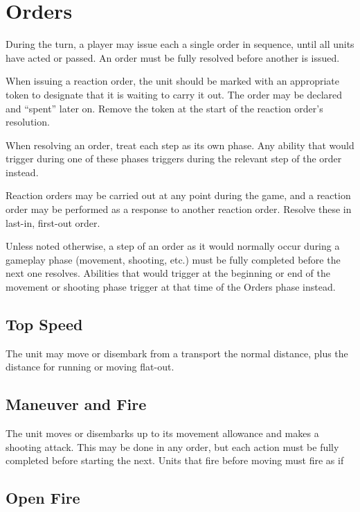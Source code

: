 \documentclass[letterpaper,twocolumn,oneside,titlepage]{book}
\begin{document}
\section{\texorpdfstring{\textbf{Orders}}{Orders}}\label{orders}

During the turn, a player may issue each a single order in sequence,
until all units have acted or passed. An order must be fully resolved
before another is issued.

When issuing a reaction order, the unit should be marked with an
appropriate token to designate that it is waiting to carry it out. The
order may be declared and ``spent'' later on. Remove the token at the
start of the reaction order's resolution.

When resolving an order, treat each step as its own phase. Any ability
that would trigger during one of these phases triggers during the
relevant step of the order instead.

Reaction orders may be carried out at any point during the game, and a
reaction order may be performed as a response to another reaction order.
Resolve these in last-in, first-out order.

Unless noted otherwise, a step of an order as it would normally occur
during a gameplay phase (movement, shooting, etc.) must be fully
completed before the next one resolves. Abilities that would trigger at
the beginning or end of the movement or shooting phase trigger at that
time of the Orders phase instead.

\subsection{\texorpdfstring{\textbf{Top
Speed}}{Top Speed}}\label{top-speed}

The unit may move or disembark from a transport the normal distance,
plus the distance for running or moving flat-out.

\subsection{\texorpdfstring{\textbf{Maneuver and
Fire}}{Maneuver and Fire}}\label{maneuver-and-fire}

The unit moves or disembarks up to its movement allowance and makes a
shooting attack. This may be done in any order, but each action must be
fully completed before starting the next. Units that fire before moving
must fire as if

\subsection{\texorpdfstring{\textbf{Open
Fire}}{Open Fire}}\label{open-fire}
\end{document}
